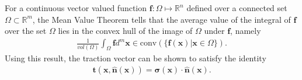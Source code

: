 \begin{example}\label{ex:traction}
    For a continuous vector valued function $\bm{f}:\Omega\mapsto \mathbb{R}^n$ defined over a connected set $\Omega\subset\mathbb{R}^m$, the Mean Value Theorem tells that the average value of the integral of $\bm{f}$ over the set $\Omega$ lies in the convex hull of the image of $\Omega$ under $\bm{f}$, namely 
    \begin{align*}
        \frac{1}{vol(\Omega)}\int_\Omega\bm{f}d^m\bm{x} \in \text{conv}(\{\bm{f}(\bm{x})|\bm{x}\in\Omega\}).
    \end{align*}
    Using this result, the traction vector can be shown to satisfy the identity
    \begin{align*}
        \bm{t}(\bm{x},\bm{\hat{n}}(\bm{x}))=\bm{\sigma}(\bm{x})\cdot\bm{\hat{n}}(\bm{x}).
    \end{align*}
    

\end{example}
